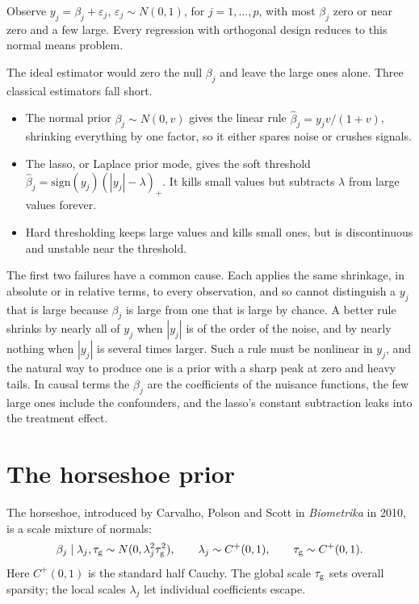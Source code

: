 Observe $y_j = \beta_j + \varepsilon_j$, $\varepsilon_j \sim N(0, 1)$, for $j = 1, \ldots, p$, with most $\beta_j$ zero or near zero and a few large. Every regression with orthogonal design reduces to this normal means problem.

The ideal estimator would zero the null $\beta_j$ and leave the large ones alone. Three classical estimators fall short.
\begin{itemize}
\item The normal prior $\beta_j \sim N(0, v)$ gives the linear rule $\hat\beta_j = y_j v/(1+v)$, shrinking everything by one factor, so it either spares noise or crushes signals.
\item The lasso, or Laplace prior mode, gives the soft threshold $\hat\beta_j = \mathrm{sign}(y_j)(|y_j| - \lambda)_+$. It kills small values but subtracts $\lambda$ from large values forever. 
\item Hard thresholding keeps large values and kills small ones, but is discontinuous and unstable near the threshold.
\end{itemize}

The first two failures have a common cause. Each applies the same shrinkage, in absolute or in relative terms, to every observation, and so cannot distinguish a $y_j$ that is large because $\beta_j$ is large from one that is large by chance. A better rule shrinks by nearly all of $y_j$ when $|y_j|$ is of the order of the noise, and by nearly nothing when $|y_j|$ is several times larger. Such a rule must be nonlinear in $y_j$, and the natural way to produce one is a prior with a sharp peak at zero and heavy tails. In causal terms the $\beta_j$ are the coefficients of the nuisance functions, the few large ones include the confounders, and the lasso's constant subtraction leaks into the treatment effect.

\section{The horseshoe prior}

The horseshoe, introduced by Carvalho, Polson and Scott in \emph{Biometrika} in 2010, is a scale mixture of normals:
\begin{equation}
\beta_j \mid \lambda_j, \tau_{\mathrm{g}} \sim N(0, \lambda_j^2\tau_{\mathrm{g}}^2), \qquad \lambda_j \sim C^+(0, 1), \qquad \tau_{\mathrm{g}} \sim C^+(0,1).
\label{eq:hs}
\end{equation}
Here $C^+(0,1)$ is the standard half Cauchy. The global scale $\tau_{\mathrm{g}}$ sets overall sparsity; the local scales $\lambda_j$ let individual coefficients escape.

